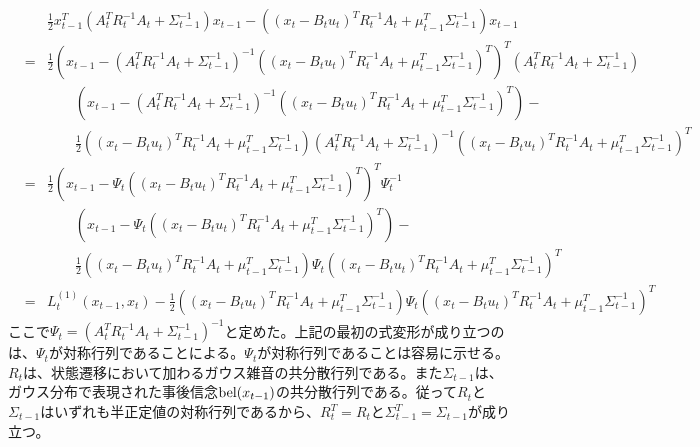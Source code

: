 \documentclass[dvipdfmx,a4paper]{jsarticle}
\begin{document}
\begin{eqnarray}
	&& \frac{1}{2} x_{t - 1}^T \left( A_t^T R_t^{-1} A_t + \Sigma_{t - 1}^{-1} \right) x_{t - 1} -\left( \left( x_t - B_t u_t \right)^T R_t^{-1} A_t + \mu_{t - 1}^T \Sigma_{t - 1}^{-1} \right) x_{t - 1} \nonumber \\
	&=& \frac{1}{2} \left( x_{t - 1} - \left( A_t^T R_t^{-1} A_t + \Sigma_{t - 1}^{-1} \right)^{-1} \left( \left( x_t - B_t u_t \right)^T R_t^{-1} A_t + \mu_{t - 1}^T \Sigma_{t - 1}^{-1} \right)^T \right)^T \left( A_t^T R_t^{-1} A_t + \Sigma_{t - 1}^{-1} \right) \nonumber \\
	&& \qquad \left( x_{t - 1} - \left( A_t^T R_t^{-1} A_t + \Sigma_{t - 1}^{-1} \right)^{-1} \left( \left( x_t - B_t u_t \right)^T R_t^{-1} A_t + \mu_{t - 1}^T \Sigma_{t - 1}^{-1} \right)^T \right) - \nonumber \\
	&& \qquad \frac{1}{2} \left( \left( x_t - B_t u_t \right)^T R_t^{-1} A_t + \mu_{t - 1}^T \Sigma_{t - 1}^{-1} \right) \left( A_t^T R_t^{-1} A_t + \Sigma_{t - 1}^{-1} \right)^{-1} \left( \left( x_t - B_t u_t \right)^T R_t^{-1} A_t + \mu_{t - 1}^T \Sigma_{t - 1}^{-1} \right)^T \nonumber \\
	&=& \frac{1}{2} \left( x_{t - 1} - \Psi_t \left( \left( x_t - B_t u_t \right)^T R_t^{-1} A_t + \mu_{t - 1}^T \Sigma_{t - 1}^{-1} \right)^T \right)^T \Psi_t^{-1} \nonumber \\
	&& \qquad \left( x_{t - 1} - \Psi_t \left( \left( x_t - B_t u_t \right)^T R_t^{-1} A_t + \mu_{t - 1}^T \Sigma_{t - 1}^{-1} \right)^T \right) - \nonumber \\
	&& \qquad \frac{1}{2} \left( \left( x_t - B_t u_t \right)^T R_t^{-1} A_t + \mu_{t - 1}^T \Sigma_{t - 1}^{-1} \right) \Psi_t \left( \left( x_t - B_t u_t \right)^T R_t^{-1} A_t + \mu_{t - 1}^T \Sigma_{t - 1}^{-1} \right)^T \\
	&=& L_t^{(1)}(x_{t - 1}, x_t) - \frac{1}{2} \left( \left( x_t - B_t u_t \right)^T R_t^{-1} A_t + \mu_{t - 1}^T \Sigma_{t - 1}^{-1} \right) \Psi_t \left( \left( x_t - B_t u_t \right)^T R_t^{-1} A_t + \mu_{t - 1}^T \Sigma_{t - 1}^{-1} \right)^T
\end{eqnarray}
ここで$\Psi_t = \left( A_t^T R_t^{-1} A_t + \Sigma_{t - 1}^{-1} \right)^{-1}$と定めた。上記の最初の式変形が成り立つのは、$\Psi_t$が対称行列であることによる。$\Psi_t$が対称行列であることは容易に示せる。$R_t$は、状態遷移において加わるガウス雑音の共分散行列である。また$\Sigma_{t - 1}$は、ガウス分布で表現された事後信念$\operatorname{bel}(x_{t - 1})$の共分散行列である。従って$R_t$と$\Sigma_{t - 1}$はいずれも半正定値の対称行列であるから、$R_t^T = R_t$と$\Sigma_{t - 1}^T = \Sigma_{t - 1}$が成り立つ。
\end{document}
